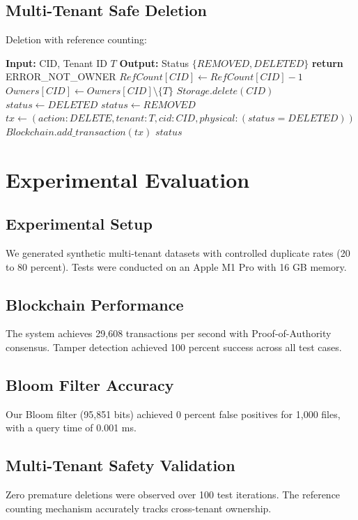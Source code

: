 \documentclass[conference]{IEEEtran}
\begin{document}
\subsection{Multi-Tenant Safe Deletion}
Deletion with reference counting:

\begin{algorithmic}
\STATE \textbf{Input:} CID, Tenant ID $T$
\STATE \textbf{Output:} Status $\{REMOVED, DELETED\}$
\STATE
{}
    \STATE \textbf{return} ERROR\_NOT\_OWNER
\ENDIF
\STATE
\STATE $RefCount[CID] \gets RefCount[CID] - 1$
\STATE $Owners[CID] \gets Owners[CID] \setminus \{T\}$
\STATE
{}
    \STATE $Storage.delete(CID)$
    \STATE $status \gets DELETED$
\ELSE
    \STATE $status \gets REMOVED$
\ENDIF
\STATE
\STATE $tx \gets (action: DELETE, tenant: T, cid: CID, physical: (status = DELETED))$
\STATE $Blockchain.add\_transaction(tx)$
\STATE
\RETURN $status$
\end{algorithmic}

\section{Experimental Evaluation}

\subsection{Experimental Setup}
We generated synthetic multi-tenant datasets with controlled duplicate rates (20 to 80 percent). Tests were conducted on an Apple M1 Pro with 16 GB memory.

\subsection{Blockchain Performance}
The system achieves 29,608 transactions per second with Proof-of-Authority consensus. Tamper detection achieved 100 percent success across all test cases.

\subsection{Bloom Filter Accuracy}
Our Bloom filter (95,851 bits) achieved 0 percent false positives for 1,000 files, with a query time of 0.001 ms.

\subsection{Multi-Tenant Safety Validation}
Zero premature deletions were observed over 100 test iterations. The reference counting mechanism accurately tracks cross-tenant ownership.
\end{document}
